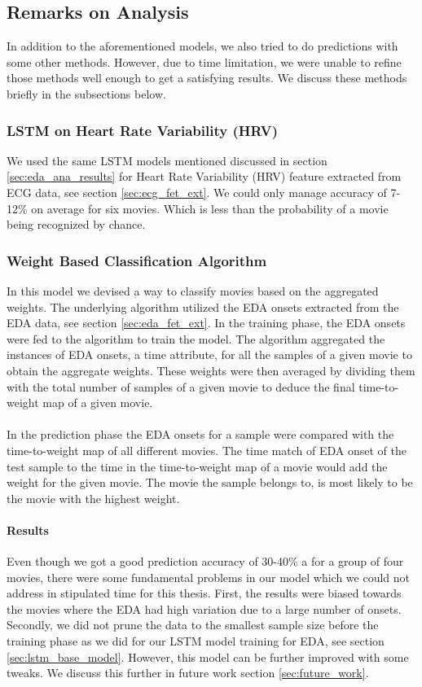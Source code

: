 \subsection{Remarks on Analysis}
In addition to the aforementioned models, we also tried to do predictions with some other methods. However, due to time limitation, we were unable to refine those methods well enough to get a satisfying results. We discuss these methods briefly in the subsections below.
\subsubsection{LSTM on Heart Rate Variability (HRV)} We used the same LSTM models mentioned discussed in section \ref{sec:eda_ana_results} for Heart Rate Variability (HRV) feature extracted from ECG data, see section \ref{sec:ecg_fet_ext}. We could only manage accuracy of 7-12\% on average for six movies. Which is less than the probability of a movie being recognized by chance.

\subsubsection{Weight Based Classification Algorithm} In this model we devised a way to classify movies based on the aggregated weights. The underlying algorithm utilized the EDA onsets extracted from the EDA data, see section \ref{sec:eda_fet_ext}. In the training phase, the EDA onsets were fed to the algorithm to train the model. The algorithm aggregated the instances of EDA onsets, a time attribute, for all the samples of a given movie to obtain the aggregate weights. These weights were then averaged by dividing them with the total number of samples of a given movie to deduce the final time-to-weight map of a given movie.

\paragraph{} In the prediction phase the EDA onsets for a sample were compared with the time-to-weight map of all different movies. The time match of EDA onset of the test sample to the time in the time-to-weight map of a movie would add the weight for the given movie. The movie the sample belongs to, is most likely to be the movie with the highest weight.
\paragraph{Results} Even though we got a good prediction accuracy of 30-40\% a for a group of four movies, there were some fundamental problems in our model which we could not address in stipulated time for this thesis. First, the results were biased towards the movies where the EDA had high variation due to a large number of onsets. Secondly, we did not prune the data to the smallest sample size before the training phase as we did for our LSTM model training for EDA, see section \ref{sec:lstm_base_model}. However, this model can be further improved with some tweaks. We discuss this further in future work section \ref{sec:future_work}.

